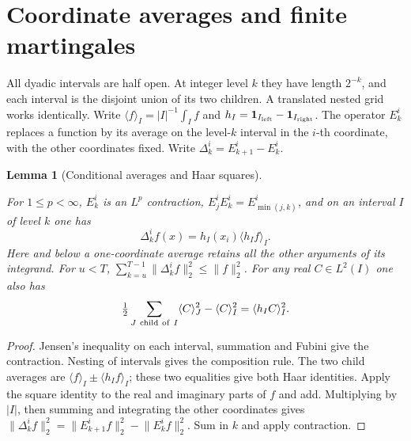 \documentclass[11pt,letterpaper]{article}
\newtheorem{lemma}[theorem]{Lemma}
\theoremstyle{definition}
\newcommand{\ind}{\mathbf1}
\newcommand{\norm}[1]{\lVert#1\rVert}
\providecommand{\lean}[1]{}
\begin{document}
\section{Coordinate averages and finite martingales}

All dyadic intervals are half open. At integer level \(k\) they have
length \(2^{-k}\), and each interval is the disjoint union of its two
children. A translated nested grid works identically. Write
\(\langle f\rangle_I=|I|^{-1}\int_I f\) and
\(h_I=\ind_{I_{\rm left}}-\ind_{I_{\rm right}}\). The operator
\(E_k^i\) replaces a function by its average on the level-\(k\)
interval in the \(i\)-th coordinate, with the other coordinates fixed.
Write \(\Delta_k^i=E_{k+1}^i-E_k^i\).

\begin{lemma}[Conditional averages and Haar squares]\label{bp:haar-square}
\lean{TwistedParaproduct.haarSquare}
For \(1\le p<\infty\), \(E_k^i\) is an \(L^p\) contraction,
\(E_j^iE_k^i=E_{\min(j,k)}^i\), and on an interval \(I\) of
level \(k\) one has
\[
       \Delta_k^i f(x)=h_I(x_i)\langle h_I f\rangle_I .
\]
Here and below a one-coordinate average retains all the other arguments
of its integrand. For \(u<T\),
\(\sum_{k=u}^{T-1}\norm{\Delta_k^i f}_2^2\le\norm{f}_2^2\).
For any real \(C\in L^2(I)\) one also has
\[
 \tfrac12\sum_{J\ {\rm child\ of}\ I}\langle C\rangle_J^2
                  -\langle C\rangle_I^2=\langle h_I C\rangle_I^2 .
\]
\end{lemma}
\begin{proof}
Jensen's inequality on each interval, summation and Fubini give the
contraction. Nesting of intervals gives the composition rule. The two
child averages are \(\langle f\rangle_I\pm\langle h_I f\rangle_I\);
these two equalities give both Haar identities. Apply the square
identity to the real and imaginary parts of \(f\) and add.
Multiplying by \(|I|\), then summing and integrating
the other coordinates gives
\(\norm{\Delta_k^i f}_2^2=\norm{E_{k+1}^i f}_2^2-\norm{E_k^i f}_2^2\).
Sum in \(k\) and apply contraction.
\end{proof}
\end{document}
